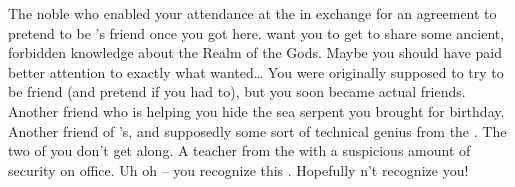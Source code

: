 \documentclass[char]{GL2020}
\begin{document}
\begin{contacts}
	\contact{\cWildCard{}} The \pFarm{} noble\cWildCard{\person} who enabled your attendance at the \pSchool{} in exchange for an agreement to pretend to be \cDisney{}'s friend once you got here. \cWildCard{\They} want\cWildCard{\plural} you to get \cDisney{} to share some ancient, forbidden knowledge about the Realm of the Gods. Maybe you should have paid better attention to exactly what \cWildCard{} wanted\ldots{}
	\contact{\cDisney{}} You were originally supposed to try to be \cDisney{\their} friend (and pretend if you had to), but you soon became actual friends.
	\contact{\cAdopted{}} Another friend who is helping you hide the sea serpent you brought \cDisney{} for \cDisney{\their} birthday.
	\contact{\cTechStar{}} Another friend of \cDisney{}'s, and supposedly some sort of technical genius from the \pTech{}. The two of you don't get along.
	\contact{\cChupInventor{}} A teacher from the \pTech{} with a suspicious amount of security on \cChupInventor{\their} office.
\contact{\cChupLeader{}} Uh oh – you recognize this \cChupLeader{\pal}. Hopefully \cChupLeader{\they} \cChupLeader{\does}n't recognize you!
\end{contacts}
\end{document}
